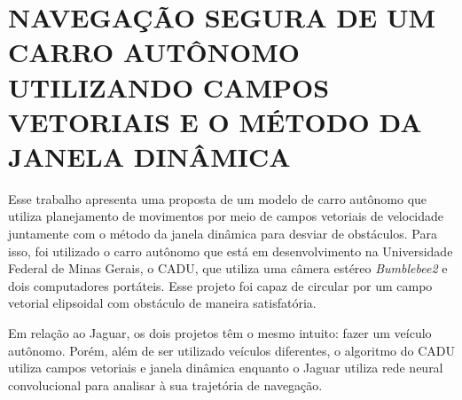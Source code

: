 \section{NAVEGAÇÃO SEGURA DE UM CARRO AUTÔNOMO UTILIZANDO CAMPOS VETORIAIS E O MÉTODO DA JANELA DINÂMICA}
\label{NAVEGAÇÃO_SEGURA}

Esse trabalho apresenta uma proposta de um modelo de carro autônomo que utiliza planejamento de movimentos por meio de campos vetoriais de velocidade juntamente com o método da janela dinâmica para desviar de obstáculos. Para isso, foi utilizado o carro autônomo que está em desenvolvimento na Universidade Federal de Minas Gerais, o CADU, que utiliza uma câmera estéreo \textit{Bumblebee2} e dois computadores portáteis. Esse projeto foi capaz de circular por um campo vetorial elipsoidal com obstáculo de maneira satisfatória. \cite{marcatto2014desenvolvimento}

Em relação ao Jaguar, os dois projetos têm o mesmo intuito: fazer um veículo autônomo. Porém, além de ser utilizado veículos diferentes, o algoritmo do CADU utiliza campos vetoriais e janela dinâmica enquanto o Jaguar utiliza rede neural convolucional para analisar à sua trajetória de navegação.

\begin{comment}
\Gls{ambiguidade}
\Gls{braile}
\Gls{coerencia}
\Gls{dialetos}
\Gls{elipse}
\Gls{locucao-adjetiva}
\Gls{modificadores}
\Gls{paronimos}
\Gls{sintese}
\Gls{borboleta}
\end{comment}